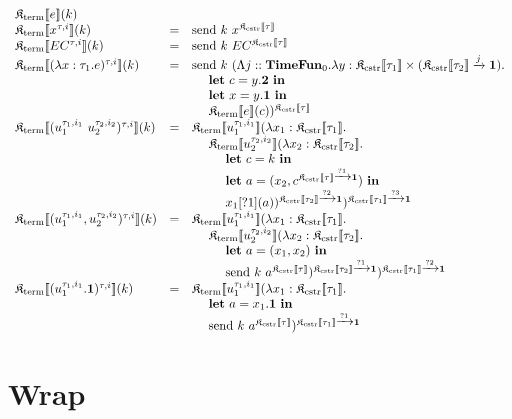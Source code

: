\documentclass[fleqn]{article}
\begin{document}
\[
\begin{array}{lcl}
	\cpst{e}{k} \\
	\cpst{x^{\tau,i}}{k} & = & \mathrm{send}~k~x^{\cpsc{\tau}} \\
	\cpst{EC^{\tau,i}}{k} & = & \mathrm{send}~k~EC^{\cpsc{\tau}} \\
	\cpst{(\lambda x : \tau_1. e)^{\tau,i}}{k} & = & \mathrm{send}~k~(\Lambda j :: \mathbf{TimeFun}_0. \lambda y : \cpsc{\tau_1} \times (\cpsc{\tau_2} \xrightarrow{j} \mathbf{1}). \\
	& & ~~~~ \mathbf{let}~c=y.\mathbf{2}~\mathbf{in} \\
	& & ~~~~ \mathbf{let}~x=y.\mathbf{1}~\mathbf{in} \\
	& & ~~~~ \cpst{e}{c})^{\cpsc{\tau}} \\
	\cpst{(u_1^{\tau_1,i_1}~u_2^{\tau_2,i_2})^{\tau,i}}{k} & = & \cpst{u_1^{\tau_1,i_1}}{\lambda x_1 : \cpsc{\tau_1}. \\
	& & ~~~~ \cpst{u_2^{\tau_2,i_2}}{\lambda x_2:\cpsc{\tau_2}. \\
	& & ~~~~~~~~ \mathbf{let}~c = k~\mathbf{in} \\
	& & ~~~~~~~~ \mathbf{let}~a = (x_2,c^{\cpsc{\tau} \xrightarrow{?1} \mathbf{1}})~\mathbf{in} \\
	& & ~~~~~~~~ x_1[?1](a) }^{\cpsc{\tau_2} \xrightarrow{?2} \mathbf{1}} }^{\cpsc{\tau_1} \xrightarrow{?3} \mathbf{1}} \\
	\cpst{(u_1^{\tau_1,i_1},u_2^{\tau_2,i_2})^{\tau,i}}{k} & = & \cpst{u_1^{\tau_1,i_1}}{\lambda x_1 : \cpsc{\tau_1}. \\
	& & ~~~~ \cpst{u_2^{\tau_2,i_2}}{\lambda x_2 : \cpsc{\tau_2}. \\
	& & ~~~~~~~~ \mathbf{let}~a=(x_1,x_2)~\mathbf{in} \\
	& & ~~~~~~~~ \mathrm{send}~k~a^{\cpsc{\tau}} }^{\cpsc{\tau_2} \xrightarrow{?1} \mathbf{1}} }^{\cpsc{\tau_1} \xrightarrow{?2} \mathbf{1}} \\
	\cpst{(u_1^{\tau_1,i_1}.\mathbf{1})^{\tau,i}}{k} & = & \cpst{u_1^{\tau_1,i_1}}{\lambda x_1 : \cpsc{\tau_1}. \\
	& & ~~~~ \mathbf{let}~a=x_1.\mathbf{1}~\mathbf{in} \\
	& & ~~~~ \mathrm{send}~k~a^{\cpsc{\tau}} }^{\cpsc{\tau_1} \xrightarrow{?1} \mathbf{1}}
\end{array}
\]

\section{Wrap}
\end{document}
